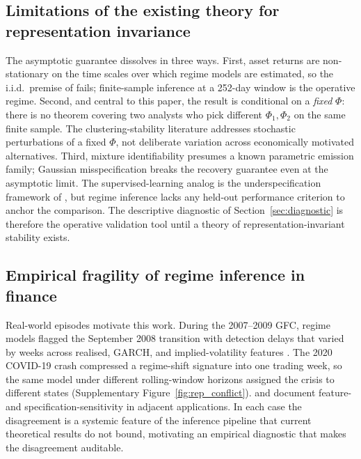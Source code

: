 \documentclass[preprint,12pt,authoryear]{elsarticle}
\begin{document}
\subsection{Limitations of the existing theory for representation invariance}
\label{app:theory_limits}

The asymptotic guarantee dissolves in three ways. First, asset returns are non-stationary on the time scales over which regime models are estimated, so the i.i.d.\ premise of \citet{Teicher1963} fails; finite-sample inference at a 252-day window is the operative regime. Second, and central to this paper, the result is conditional on a \emph{fixed} $\Phi$: there is no theorem covering two analysts who pick different $\Phi_1, \Phi_2$ on the same finite sample. The clustering-stability literature \citep{BenDavidLuxburgPal06,vonLuxburg2010} addresses stochastic perturbations of a fixed $\Phi$, not deliberate variation across economically motivated alternatives. Third, mixture identifiability presumes a known parametric emission family; Gaussian misspecification breaks the recovery guarantee even at the asymptotic limit. The supervised-learning analog is the underspecification framework of \citet{DAmouretal2022}, but regime inference lacks any held-out performance criterion to anchor the comparison. The descriptive diagnostic of Section~\ref{sec:diagnostic} is therefore the operative validation tool until a theory of representation-invariant stability exists.

\subsection{Empirical fragility of regime inference in finance}

Real-world episodes motivate this work. During the 2007--2009 GFC, regime models flagged the September 2008 transition with detection delays that varied by weeks across realised, GARCH, and implied-volatility features \citep{DanielssonJamesValenzuelaZer2016}. The 2020 COVID-19 crash compressed a regime-shift signature into one trading week, so the same model under different rolling-window horizons assigned the crisis to different states (Supplementary Figure~\ref{fig:rep_conflict}). \citet{Ampountolas2025FRL} and \citet{BlazsekKongShadoff2025} document feature- and specification-sensitivity in adjacent applications. In each case the disagreement is a systemic feature of the inference pipeline that current theoretical results do not bound, motivating an empirical diagnostic that makes the disagreement auditable.
\end{document}
